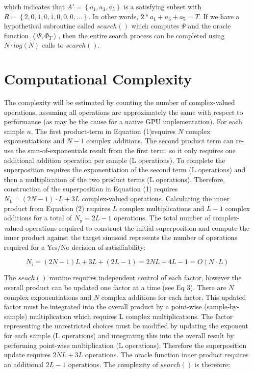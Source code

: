 \documentclass[reqno]{amsart}
\theoremstyle{definition}
\theoremstyle{remark}
\begin{document}
\noindent
which indicates that $A'= \left\{a_1, a_3, a_5 \right\}$ is a satisfying subset with $R = \left\{2,0,1,0,1,0,0,0,...\right\}$. 
In other words, $2*a_1 + a_3 + a_5 = T $. If we have a hypothetical subroutine called $search()$ which computes $\Psi$ and the oracle function
$\left \langle  \Psi, \Phi _T  \right \rangle $, then the entire search process can be completed using $N\cdot log(N)$ calls to $search()$.




\section{Computational Complexity}
The complexity will be estimated by counting the number of complex-valued operations, assuming all operations are approximately the same with respect to performance (as may be the cause for a native GPU implementation). For each sample $n$, The first product-term in Equation (1)requires $N$ complex exponentiations and $N-1$ complex additions. The second product term can re-use the sum-of-exponentials result from the first term, so it only requires one additional addition operation per sample (L operations). To complete the superposition requires the exponentiation of the second term (L operations) and then a multiplication of the two product terms (L operations). Therefore, construction of the superposition in Equation (1) requires $N_1 = (2N-1)\cdot L + 3L$ complex-valued operations. Calculating the inner product from Equation (2) requires $L$ complex multiplications and $L-1$ complex additions for a total of $N_p = 2L - 1$ operations. The total number of complex-valued operations required to construct the initial superposition and compute the inner product against the target sinusoid represents the number of operations required for a Yes/No decision of satisifiability:

\begin{equation}
N_i = (2N-1)L + 3L + (2L - 1) = 2NL + 4L -1 =O(N \cdot L)
\end{equation}

The $seach()$ routine requires independent control of each factor, however the overall product can be updated one factor at a time (see Eq 3). There are $N$ complex exponentiations and $N$ complex additions for each factor. This updated factor must be integrated into the overall product by a point-wise (sample-by-sample) multiplication which requires L complex multiplications. The factor representing the unrestricted choices must be modified by updating the exponent for each sample (L operations) and integrating this into the overall result by performing point-wise multiplication (L operations). Therefore the superposition update requires $ 2NL + 3L$ operations. The oracle function inner product requires an additional $2L-1$ operations. The complexity of $search()$ is therefore:
\end{document}
